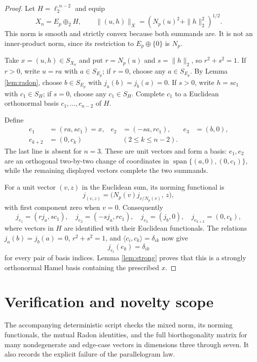 \documentclass[11pt]{article}
\begin{document}
\begin{proof}
Let $H=\ell_2^{,n-2}$ and equip
\[
 X_n=E_p\oplus_2 H,
 \qquad \|(u,h)\|_X=(N_p(u)^2+\|h\|_2^2)^{1/2}.
\]
This norm is smooth and strictly convex because both summands are.  It is not
an inner-product norm, since its restriction to $E_p\oplus\{0\}$ is $N_p$.

Take $x=(u,h)\in S_{X_n}$ and put $r=N_p(u)$ and $s=\|h\|_2$, so
$r^2+s^2=1$.  If $r>0$, write $u=ra$ with $a\in S_{E_p}$; if $r=0$, choose
any $a\in S_{E_p}$.  By Lemma \ref{lem:radon}, choose $b\in S_{E_p}$ with
$j_a(b)=j_b(a)=0$.  If $s>0$, write $h=sc_1$ with $c_1\in S_H$; if $s=0$,
choose any $c_1\in S_H$.  Complete $c_1$ to a Euclidean orthonormal basis
$c_1,\ldots,c_{n-2}$ of $H$.

Define
\begin{align*}
 e_1&=(ra,sc_1)=x,&
 e_2&=(-sa,rc_1),&
 e_3&=(b,0),\\
 e_{k+2}&=(0,c_k) &&(2\le k\le n-2).
\end{align*}
The last line is absent for $n=3$.  These are unit vectors and form a basis:
$e_1,e_2$ are an orthogonal two-by-two change of coordinates in
$\operatorname{span}\{(a,0),(0,c_1)\}$, while the remaining displayed
vectors complete the two summands.

For a unit vector $(v,z)$ in the Euclidean sum, its norming functional is
\[
 j_{(v,z)}=\bigl(N_p(v)j_{v/N_p(v)},\,z\bigr),
\]
with first component zero when $v=0$.  Consequently
\[
 j_{e_1}=(rj_a,sc_1),\quad
 j_{e_2}=(-sj_a,rc_1),\quad
 j_{e_3}=(j_b,0),\quad
 j_{e_{k+2}}=(0,c_k),
\]
where vectors in $H$ are identified with their Euclidean functionals.
The relations $j_a(b)=j_b(a)=0$, $r^2+s^2=1$, and
$\langle c_i,c_k\rangle=\delta_{ik}$ now give
\[
 j_{e_i}(e_k)=\delta_{ik}
\]
for every pair of basis indices.  Lemma \ref{lem:strong} proves that this is
a strongly orthonormal Hamel basis containing the prescribed $x$.
\end{proof}

\section{Verification and novelty scope}

The accompanying deterministic script checks the mixed norm, its norming
functionals, the mutual Radon identities, and the full biorthogonality matrix
for many nondegenerate and edge-case vectors in dimensions three through
seven.  It also records the explicit failure of the parallelogram law.
\end{document}
